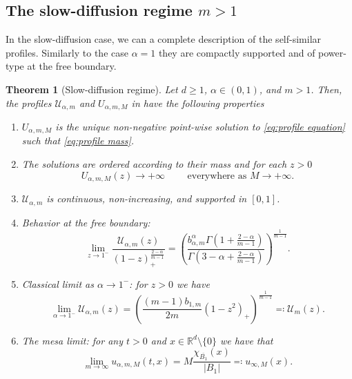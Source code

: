 \documentclass[a4paper]{article}
\newtheorem{theorem}{Theorem}[section]
\theoremstyle{definition}
\begin{document}
\subsection{The slow-diffusion regime $m > 1$}
In the slow-diffusion case, we can a complete description of the self-similar profiles. Similarly to the case $\alpha = 1$ they are compactly supported and of power-type at the free boundary.
\begin{theorem}[Slow-diffusion regime]
  \label{thm:slow-diffusion}
  Let $d \ge 1$, $\alpha \in (0,1)$, and $m > 1$.
  Then, the profiles $\mathcal U_{\alpha,m}$ and $U_{\alpha,m,M}$ in  have the following properties
  \begin{enumerate}
    \item
      $U_{\alpha,m,M}$ is the unique non-negative point-wise solution to \eqref{eq:profile equation} such that \eqref{eq:profile mass}.
    \item The solutions are ordered according to their mass and for each $z > 0$
      \[
        U_{\alpha,m,M}(z) \to +\infty  \qquad \text{ everywhere as } M \to +\infty .
      \]
    \item
      \label{it:slow-diffusion U compactly supported}
      $\mathcal U_{\alpha,m}$ is continuous, non-increasing, and supported in $[0,1]$.
    \item
      Behavior at the free boundary:
      \begin{equation}
        \label{eq:slow sharp constant at free boundary}
        \lim_{z \to 1^-} \frac{\mathcal U_{\alpha,m}(z)}{(1-z)_+^{\frac {2-\alpha }{m-1}}} = \left( \frac{b_{\alpha,m}^\alpha \Gamma(1 + \tfrac{2-\alpha}{m-1} )}{\Gamma(3-\alpha+\tfrac{2-\alpha}{m-1})} \right)^{\frac{1}{m-1}}.
      \end{equation}
    \item Classical limit as $\alpha \to 1^-$: for $z > 0$ we have
      \begin{equation}
        \label{eq:m>1 limit alpha->1}
        \lim_{\alpha \to 1^-}\mathcal U_{\alpha,m}(z) =  \left( \frac{(m-1)b_{1,m}}{2m} (1-z^2)_+ \right)^{\frac 1 {m-1}} \eqqcolon \mathcal U_{m}(z).
      \end{equation}
    \item
      \label{thm:mesa}
      The mesa limit: for any $t > 0$ and $x \in \mathbb R^d \setminus \{0\}$ we have that
      \begin{equation}
        \lim_{m \to \infty} u_{\alpha,m,M}(t,x) = M \frac{\chi_{\overline{B_1}} (x)}{|B_1|}  \eqqcolon u_{\infty,M}(x).
      \end{equation}
  \end{enumerate}
\end{theorem}
\end{document}
